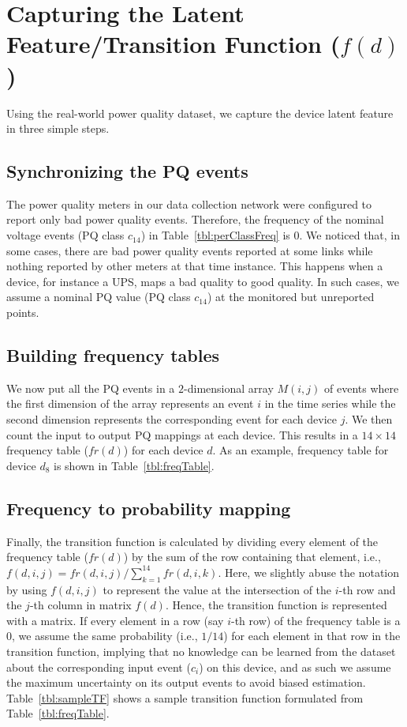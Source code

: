 \vspace{0.5cm}
\section{Capturing the Latent Feature/Transition Function ($f(d)$)}
Using the real-world power quality dataset, we capture the device latent feature in three simple steps.

\subsection{Synchronizing the PQ events} The power quality meters in our data collection network were configured to report only bad power quality events. Therefore, the frequency of the nominal voltage events (PQ class $c_{14}$) in Table~\ref{tbl:perClassFreq} is 0. We noticed that, in some cases, there are bad power quality events reported at some links while nothing reported by other meters at that time instance. This happens when a device, for instance a UPS, maps a bad quality to good quality. In such cases, we assume a nominal PQ value (PQ class $c_{14}$) at the monitored but unreported points.

\subsection{Building frequency tables} We now put all the PQ events in a $2$-dimensional array $M(i, j)$ of events where the first dimension of the array represents an event $i$ in the time series while the second dimension represents the corresponding event for each device $j$. We then count the input to output PQ mappings at each device. This results in a $14 \times 14$ frequency table ($fr(d)$) for each device $d$. As an example, frequency table for device $d_8$ is shown in Table~\ref{tbl:freqTable}.

\subsection{Frequency to probability mapping} Finally, the transition function is calculated by dividing every element of the frequency table ($fr(d)$) by the sum of the row containing that element, i.e., $f(d, i, j) = fr(d, i, j) / \sum_{k=1}^{14} fr(d, i, k)$. Here, we slightly abuse the notation by using $f(d, i, j)$ to represent the value at the intersection of the $i$-th row and the $j$-th column in matrix $f(d)$. Hence, the transition function is represented with a matrix. If every element in a row (say $i$-th row) of the frequency table is a $0$, we assume the same probability (i.e., $1/14$) for each element in that row in the transition function, implying that no knowledge can be learned from the dataset about the corresponding input event ($c_i$) on this device, and as such we assume the maximum uncertainty on its output events to avoid biased estimation. Table~\ref{tbl:sampleTF} shows a sample transition function formulated from Table~\ref{tbl:freqTable}.


